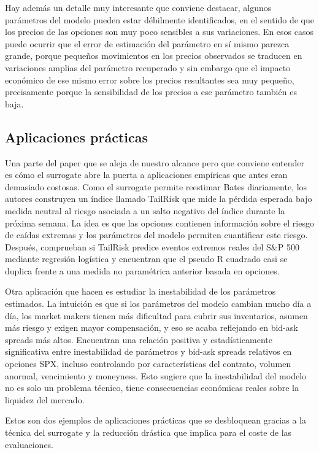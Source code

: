 \documentclass[11pt,a4paper]{article}
\begin{document}
Hay además un detalle muy interesante que conviene destacar, algunos parámetros del modelo pueden estar débilmente identificados, en el sentido de que los precios de las opciones son muy poco sensibles a sus variaciones. En esos casos puede ocurrir que el error de estimación del parámetro en sí mismo parezca grande, porque pequeños movimientos en los precios observados se traducen en variaciones amplias del parámetro recuperado y sin embargo que el impacto económico de ese mismo error sobre los precios resultantes sea muy pequeño, precisamente porque la sensibilidad de los precios a ese parámetro también es baja.

\subsection{Aplicaciones prácticas}

Una parte del paper que se aleja de nuestro alcance pero que conviene entender es cómo el surrogate abre la puerta a aplicaciones empíricas que antes eran demasiado costosas. Como el surrogate permite reestimar Bates diariamente, los autores construyen un índice llamado TailRisk que mide la pérdida esperada bajo medida neutral al riesgo asociada a un salto negativo del índice durante la próxima semana. La idea es que las opciones contienen información sobre el riesgo de caídas extremas y los parámetros del modelo permiten cuantificar este riesgo. Después, comprueban si TailRisk predice eventos extremos reales del S\&P 500 mediante regresión logística y encuentran que el pseudo R cuadrado casi se duplica frente a una medida no paramétrica anterior basada en opciones.

Otra aplicación que hacen es estudiar la inestabilidad de los parámetros estimados. La intuición es que si los parámetros del modelo cambian mucho día a día, los market makers tienen más dificultad para cubrir sus inventarios, asumen más riesgo y exigen mayor compensación, y eso se acaba reflejando en bid-ask spreads más altos. Encuentran una relación positiva y estadísticamente significativa entre inestabilidad de parámetros y bid-ask spreads relativos en opciones SPX, incluso controlando por características del contrato, volumen anormal, vencimiento y moneyness. Esto sugiere que la inestabilidad del modelo no es solo un problema técnico, tiene consecuencias económicas reales sobre la liquidez del mercado.

Estos son dos ejemplos de aplicaciones prácticas que se desbloquean gracias a la técnica del surrogate y la reducción drástica que implica para el coste de las evaluaciones.
\end{document}
